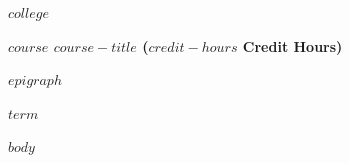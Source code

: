 \documentclass[11pt]{article}
\begin{document}

\begin{center}
  {\LARGE\bfseries $college$}\par
  \vspace{0.75em}
  {\Large\bfseries
    $course$\quad
    $course-title$\quad
    ($credit-hours$ Credit Hours)
  }\par
  \vspace{0.5em}
  {\itshape $epigraph$}\par
  \vspace{0.5em}
  {\large $term$}\par
\end{center}

\vspace{0.9\baselineskip}

$body$
\end{document}
